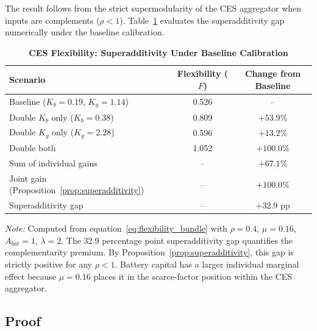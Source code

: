 	\noindent The result follows from the strict supermodularity of the CES aggregator when inputs are complements ($\rho < 1$). Table~\ref{tab:ces_complementarity} evaluates the superadditivity gap numerically under the baseline calibration.

	\begin{table}[H]
		\centering
		\caption[CES Flexibility: Superadditivity Under Baseline Calibration]{\textbf{CES Flexibility: Superadditivity Under Baseline Calibration}}
		\label{tab:ces_complementarity}
		\renewcommand{\arraystretch}{1.3}
		\small
		\begin{tabular}{l c c}
			\toprule
			\textbf{Scenario} & \textbf{Flexibility ($F$)} & \textbf{Change from Baseline} \\
			\midrule
			Baseline ($K_b = 0.19$, $K_g = 1.14$) & 0.526 & -- \\
			Double $K_b$ only ($K_b = 0.38$) & 0.809 & $+53.9$\% \\
			Double $K_g$ only ($K_g = 2.28$) & 0.596 & $+13.2$\% \\
			Double both & 1.052 & $+100.0$\% \\
			\midrule
			Sum of individual gains & -- & $+67.1$\% \\
			Joint gain (Proposition~\ref{prop:superadditivity}) & -- & $+100.0$\% \\
			Superadditivity gap & -- & $+32.9$ pp \\
			\bottomrule
		\end{tabular}
		\vspace{0.2cm}
		\parbox{\textwidth}{\footnotesize \textit{Note:} Computed from equation~\eqref{eq:flexibility_bundle} with $\rho = 0.4$, $\mu = 0.16$, $A_{bat} = 1$, $\lambda = 2$. The 32.9 percentage point superadditivity gap quantifies the complementarity premium. By Proposition~\ref{prop:superadditivity}, this gap is strictly positive for any $\rho < 1$. Battery capital has a larger individual marginal effect because $\mu = 0.16$ places it in the scarce-factor position within the CES aggregator.}
	\end{table}

	\subsection{Proof}

